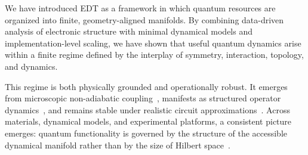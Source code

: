 \documentclass[twocolumn,10pt]{article}
\begin{document}




We have introduced EDT as a framework in which quantum resources are organized into finite, geometry-aligned manifolds. By combining data-driven analysis of electronic structure with minimal dynamical models and implementation-level scaling, we have shown that useful quantum dynamics arise within a finite regime defined by the interplay of symmetry, interaction, topology, and dynamics.

This regime is both physically grounded and operationally robust. It emerges from microscopic non-adiabatic coupling~\cite{Mead1979,Yarkony1996}, manifests as structured operator dynamics~\cite{Swingle2018}, and remains stable under realistic circuit approximations~\cite{Lloyd1996,Childs2019}. Across materials, dynamical models, and experimental platforms, a consistent picture emerges: quantum functionality is governed by the structure of the accessible dynamical manifold rather than by the size of Hilbert space~\cite{Amico2008,Eisert2010}.
\end{document}

